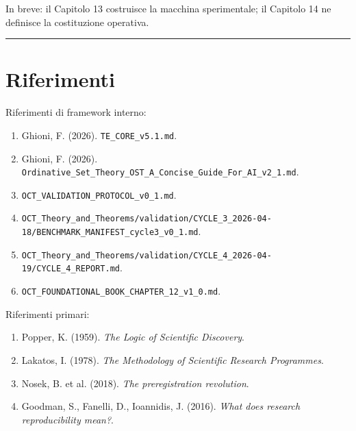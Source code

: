 In breve: il Capitolo 13 costruisce la macchina sperimentale; il Capitolo 14 ne definisce la costituzione operativa.

\begin{center}\rule{0.5\linewidth}{0.5pt}\end{center}

\section{Riferimenti}

Riferimenti di framework interno:

\begin{enumerate}
\def\labelenumi{\arabic{enumi}.}
\tightlist
\item
  Ghioni, F. (2026). \texttt{TE\_CORE\_v5.1.md}.
\item
  Ghioni, F. (2026). \texttt{Ordinative\_Set\_Theory\_OST\_A\_Concise\_Guide\_For\_AI\_v2\_1.md}.
\item
  \texttt{OCT\_VALIDATION\_PROTOCOL\_v0\_1.md}.
\item
  \texttt{OCT\_Theory\_and\_Theorems/validation/CYCLE\_3\_2026-04-18/BENCHMARK\_MANIFEST\_cycle3\_v0\_1.md}.
\item
  \texttt{OCT\_Theory\_and\_Theorems/validation/CYCLE\_4\_2026-04-19/CYCLE\_4\_REPORT.md}.
\item
  \texttt{OCT\_FOUNDATIONAL\_BOOK\_CHAPTER\_12\_v1\_0.md}.
\end{enumerate}

Riferimenti primari:

\begin{enumerate}
\def\labelenumi{\arabic{enumi}.}
\tightlist
\item
  Popper, K. (1959). \emph{The Logic of Scientific Discovery}.
\item
  Lakatos, I. (1978). \emph{The Methodology of Scientific Research Programmes}.
\item
  Nosek, B. et al. (2018). \emph{The preregistration revolution}.
\item
  Goodman, S., Fanelli, D., Ioannidis, J. (2016). \emph{What does research reproducibility mean?}.
\end{enumerate}
